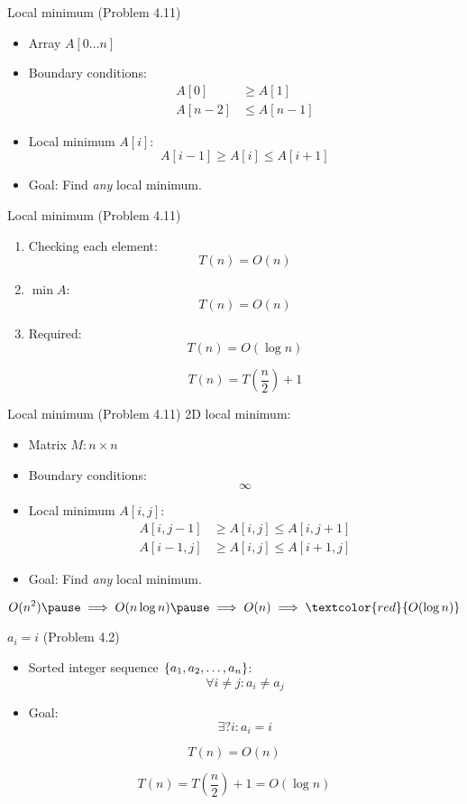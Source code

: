 \begin{frame}{Local minimum (Problem 4.11)}
  \begin{itemize}
	\item Array $A[0 \ldots n]$
	\item Boundary conditions:
	  \begin{align*}
		A[0] &\ge A[1] \\
		A[n-2] &\le A[n-1]
	  \end{align*}
	\item Local minimum $A[i]$:
	  \[
		A[i-1] \ge A[i] \le A[i+1]
	  \]
	\item Goal: Find \emph{any} local minimum.
  \end{itemize}
\end{frame}
\begin{frame}{Local minimum (Problem 4.11)}
  \begin{enumerate}
	\item Checking each element:
	  \[
		T(n) = O(n)
	  \]
	\item $\min A$:
	  \[
		T(n) = O(n)
	  \]
	\pause
	\item Required:
	  \[
		T(n) = O(\log n)
	  \]

	  \pause
	  \[
		T(n) = T(\frac{n}{2}) + 1
	  \]
  \end{enumerate}
\end{frame}
\begin{frame}{Local minimum (Problem 4.11)}
  2D local minimum:
  \begin{itemize}
	\item Matrix $M: n \times n$
	\item Boundary conditions:
	  \[
		\infty
	  \]
	\item Local minimum $A[i,j]$:
	  \begin{align*}
		A[i,j-1] &\ge A[i,j] \le A[i,j+1] \\
		A[i-1,j] &\ge A[i,j] \le A[i+1,j]
	  \end{align*}
	\item Goal: Find \emph{any} local minimum.
  \end{itemize}

  \pause
  \[
	O(n^2) \pause \implies O(n \log n) \pause \implies O(n) \implies \textcolor{red}{O(\log n)}
  \]
\end{frame}
\begin{frame}{$a_i = i$ (Problem 4.2)}
  \begin{itemize}
	\item Sorted integer sequence $\{a_1, a_2, \ldots, a_n\}$:
	  \[
		\forall i \neq j: a_i \neq a_j
	  \]
	\item Goal: 
	  \[
		\exists? i: a_i = i
	  \]
  \end{itemize}

  \pause
  \[
	T(n) = O(n)
  \]

  \pause
  \[
	T(n) = T(\frac{n}{2}) + 1 = O(\log n)
  \]
\end{frame}
